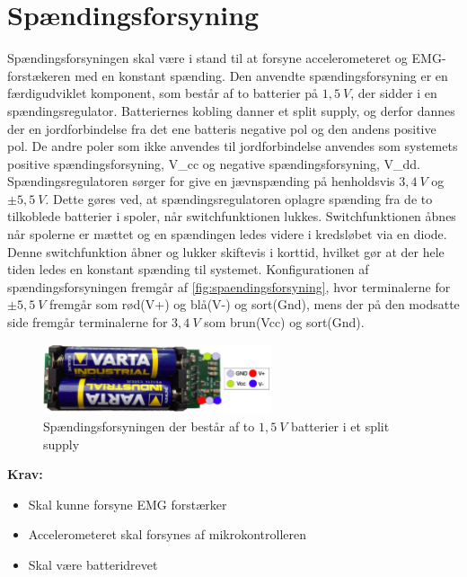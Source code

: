 \section{Spændingsforsyning}
Spændingsforsyningen skal være i stand til at forsyne accelerometeret og EMG-forstækeren med en konstant spænding. Den anvendte spændingsforsyning er en færdigudviklet komponent, som består af to batterier på $1,5~V$, der sidder i en spændingsregulator. Batteriernes kobling danner et split supply, og derfor dannes der en jordforbindelse fra det ene batteris negative pol og den andens positive pol. De andre poler som ikke anvendes til jordforbindelse anvendes som systemets positive spændingsforsyning, {V}_{cc} og negative spændingsforsyning, {V}_{dd}.
Spændingsregulatoren sørger for give en jævnspænding på henholdsvis $3,4~V$ og $\pm 5,5~V$. Dette gøres ved, at spændingsregulatoren oplagre spænding fra de to tilkoblede batterier i spoler, når switchfunktionen lukkes. Switchfunktionen åbnes når spolerne er mættet og en spændingen ledes videre i kredsløbet via en diode. Denne switchfunktion åbner og lukker skiftevis i korttid, hvilket gør at der hele tiden ledes en konstant spænding til systemet. 
Konfigurationen af spændingsforsyningen fremgår af \autoref{fig:spaendingsforsyning}, hvor terminalerne for $\pm 5,5~V$ fremgår som rød(V+) og blå(V-) og sort(Gnd), mens der på den modsatte side fremgår terminalerne for $3,4~V$ som brun(Vcc) og sort(Gnd). 

\begin{figure}[H]
\centering
\includegraphics[width=0.6\textwidth]{figures/spaendingsforsyning.png}
\caption{Spændingsforsyningen der består af to $1,5~V$ batterier i et split supply}
\label{fig:spaendingsforsyning}
\end{figure}

\textbf{Krav:}
\begin{itemize} 
\item Skal kunne forsyne EMG forstærker
\item Accelerometeret skal forsynes af mikrokontrolleren
\item Skal være batteridrevet 
\end{itemize}
